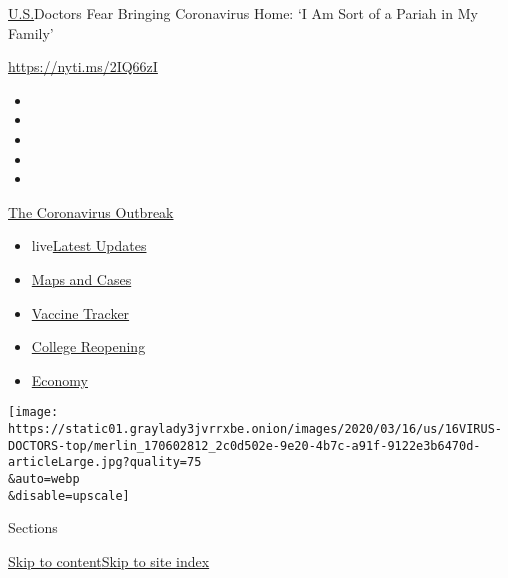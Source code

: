 \href{/section/us}{U.S.}\textbar{}Doctors Fear Bringing Coronavirus
Home: `I Am Sort of a Pariah in My Family'

\url{https://nyti.ms/2IQ66zI}

\begin{itemize}
\item
\item
\item
\item
\item
\end{itemize}

\href{https://www.nytimes3xbfgragh.onion/news-event/coronavirus?action=click\&pgtype=Article\&state=default\&region=TOP_BANNER\&context=storylines_menu}{The
Coronavirus Outbreak}

\begin{itemize}
\tightlist
\item
  live\href{https://www.nytimes3xbfgragh.onion/2020/08/03/world/coronavirus-covid-19.html?action=click\&pgtype=Article\&state=default\&region=TOP_BANNER\&context=storylines_menu}{Latest
  Updates}
\item
  \href{https://www.nytimes3xbfgragh.onion/interactive/2020/us/coronavirus-us-cases.html?action=click\&pgtype=Article\&state=default\&region=TOP_BANNER\&context=storylines_menu}{Maps
  and Cases}
\item
  \href{https://www.nytimes3xbfgragh.onion/interactive/2020/science/coronavirus-vaccine-tracker.html?action=click\&pgtype=Article\&state=default\&region=TOP_BANNER\&context=storylines_menu}{Vaccine
  Tracker}
\item
  \href{https://www.nytimes3xbfgragh.onion/2020/08/02/us/covid-college-reopening.html?action=click\&pgtype=Article\&state=default\&region=TOP_BANNER\&context=storylines_menu}{College
  Reopening}
\item
  \href{https://www.nytimes3xbfgragh.onion/live/2020/08/03/business/stock-market-today-coronavirus?action=click\&pgtype=Article\&state=default\&region=TOP_BANNER\&context=storylines_menu}{Economy}
\end{itemize}

\texttt{[image: https://static01.graylady3jvrrxbe.onion/images/2020/03/16/us/16VIRUS-DOCTORS-top/merlin\_170602812\_2c0d502e-9e20-4b7c-a91f-9122e3b6470d-articleLarge.jpg?quality=75\\\&auto=webp\\\&disable=upscale]}

Sections

\protect\hyperlink{site-content}{Skip to
content}\protect\hyperlink{site-index}{Skip to site index}

